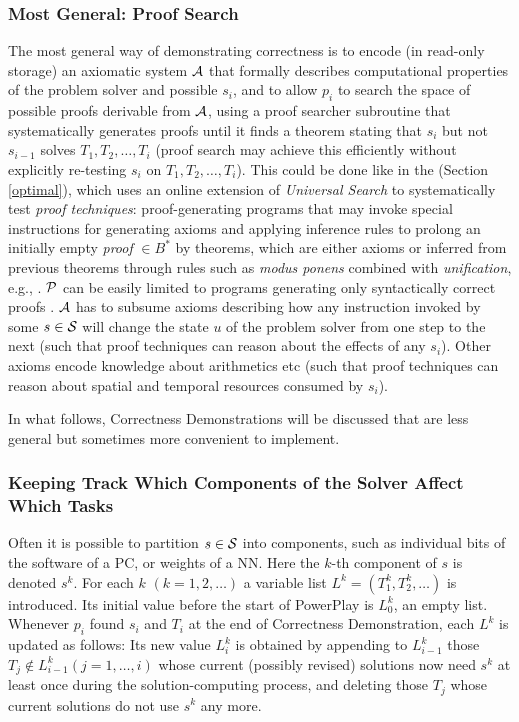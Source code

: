 \documentclass{article}
\begin{document}
\subsubsection{Most General: Proof Search}
\label{proofsearch}

The most general way of demonstrating correctness is to
encode  (in read-only storage) an axiomatic system $\cal A$  that
formally describes computational properties of the problem solver and possible $s_i$, 
and to allow $p_i$ to search the space of possible proofs derivable from $\cal A$, using
a proof searcher subroutine 
that systematically generates proofs 
until it finds a  theorem stating that $s_i$ but not $s_{i-1}$ solves $T_1, T_2, \ldots, T_i$ (proof search may 
achieve this efficiently without explicitly re-testing $s_i$ on $T_1, T_2, \ldots, T_i$).
This could be done like in the \GM \cite{Schmidhuber:09gm} (Section \ref{optimal}), which 
uses an online extension of {\em Universal Search} 
\cite{Levin:73}
to systematically test {\em 
proof techniques}: proof-generating programs that
 may invoke special instructions
for generating axioms and applying inference rules to prolong an
initially empty {\em proof} $\in B^*$ by theorems, which are
either axioms or inferred from previous
theorems through rules such
as {\em modus ponens} combined with {\em unification}, e.g.,
\cite{Fitting:96}.  
$\cal P$ can be easily  limited to programs generating only syntactically correct proofs \cite{Schmidhuber:09gm}.
$\cal A$  has to subsume axioms describing 
how any instruction invoked
by some $s \in \cal S$ will change 
the state $u$ of the problem solver
from one step to the next (such that proof techniques can reason
about the effects of any $s_i$). Other axioms encode knowledge about arithmetics etc
(such that proof techniques can reason about spatial and temporal resources consumed by $s_i$).

In what follows,  {\sc Correctness Demonstrations} will be discussed
that are less general but sometimes more convenient to implement.

\subsubsection{Keeping Track Which Components of the Solver Affect Which Tasks}
\label{components}

Often it is possible to
partition $s \in \cal S$ into components, such as individual bits of the software of a PC,
or weights of a NN.
Here the $k$-th component of $s$ is denoted $s^k$.
For each $k$ $(k=1, 2, \ldots)$  a variable list $L^k=(T^k_1, T^k_2, \ldots)$ is introduced.
Its initial value before the start of {\sc PowerPlay} is $L^k_0$, an empty list.
Whenever $p_i$ found $s_i$ and $T_i$ at the end  of  {\sc Correctness Demonstration}, 
each $L^k$ is updated as follows: Its new value $L^k_i$ is obtained by appending to $L^k_{i-1}$
those $T_j \notin L^k_{i-1} (j=1,  \ldots, i)$ whose current (possibly revised) solutions now need  $s^k$ at 
least once during the solution-computing process,
and deleting those $T_j$ whose current solutions do not use  $s^k$ any more.
\end{document}
